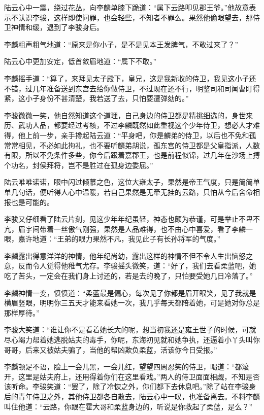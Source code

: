 陆云心中一震，绕过花丛，向李麟单膝下跪道：“属下云路叩见郡王爷。”他故意表示不认识李骏，这样即使问罪，也会轻些，不知者不罪么。果然他偷眼望去，那侍卫神情和缓，退到了李骏身后。

李麟粗声粗气地道：“原来是你小子，是不是见本王发脾气，不敢过来了？”

陆云心中更加安定，低首敛眉地道：“属下不敢。”

李麟摇手道：“算了，来拜见太子殿下，皇兄，这是我新收的侍卫，我见这小子还不错，过几年准备送到东宫去给你做侍卫，不过现在还不行，明鉴司和司闻曹盯得紧，这小子身份不甚清楚，我若送了去，只怕要遭弹劾的。”

李骏微微一笑，他自然知道这个道理，自己身边的侍卫都是精挑细选的，身世来历、武功人品，都要经过考核，不过李麟既然如此重视这个少年侍卫，想必人才难得，他上前一步，亲手搀起陆云道：“平身吧，你是麟弟的侍卫，以后也不免和孤常常相见，不必如此拘礼，也不要听麟弟胡说，孤东宫的侍卫都是父皇指派，人数有限，所以不免条件多些，你今后跟着嘉郡王，也是前程似锦，过几年在沙场上搏个功名，封侯拜将，岂不是胜过在孤身边委屈。”

陆云唯唯诺诺，眼中闪过倾慕之色，这位大雍太子，果然是帝王气度，只是简简单单几句话，便听得人心中温暖，若自己果然是无牵无挂的云路，只怕从今后舍命相报也是可能的。

李骏又仔细看了陆云片刻，见这少年年纪虽轻，神态也颇为恭谨，可是举止不卑不亢，眉宇间带着一丝傲气刚强，果然是人品难得，也不由心中喜爱，看了李麟一眼，嘉许地道：“王弟的眼力果然不凡，我见此子有长孙将军的气度。”

李麟露出得意洋洋的神情，他年纪尚幼，露出这样的神情不但不令人生出恼怒之意，反而令人觉得他稚气尤存。李骏摇头微笑，道：“好了，我们去看柔蓝吧，她吃了苦头，一定会在我们身上讨还的，若是去的晚了，只怕要受她几日冷落了。”

李麟神情一变，愤愤道：“柔蓝最是偏心，每次见了你都是眉开眼笑，见了我就是横眉竖眼，明明你三五天才能来看她一次，我几乎每天都陪着她，可是她对你总是那样厚待。”

李骏大笑道：“谁让你不是看着她长大的呢，想当初我还是雍王世子的时候，可就尽心竭力帮着她逃脱姑夫的毒手，你呢，东海初见就和她争执，还逼着小丫头叫你哥哥，后来又被姑夫骗了，当他的帮凶欺负柔蓝，活该你今日受报。”

李麟顿足不语，脸上一会儿黑，一会儿红，望望四周忍笑的侍卫，喝道：“都滚开，这里是姑夫府上，还用得着你们在这里看戏。”两人的侍卫面面相觑，不知是否该听命。李骏笑道：“罢了，除了冷恢之外，你们都下去休息吧。”除了站在李骏身后的青年侍卫之外，其他侍卫都各自散去，陆云心中一叹，也准备离去。不料李麟叫住他道：“云路，你跟在霍大哥和柔蓝身边的，听说是你救起了柔蓝，是么？”

